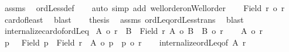 \begin{isabellebody}
\ assms\ \isamarkupfalse%
\ ordLess{\isacharunderscore}{\kern0pt}def\isanewline
\ \ \isamarkupfalse%
\ {\isacharparenleft}{\kern0pt}auto\ simp\ add{\isacharcolon}{\kern0pt}\ well{\isacharunderscore}{\kern0pt}order{\isacharunderscore}{\kern0pt}on{\isacharunderscore}{\kern0pt}Well{\isacharunderscore}{\kern0pt}order{\isacharparenright}{\kern0pt}\isanewline
\ \ \isamarkupfalse%
\ {\isachardoublequoteopen}{\isacharbar}{\kern0pt}Field\ r{\isacharbar}{\kern0pt}\ {\isasymle}o\ r{\isachardoublequoteclose}\ \isamarkupfalse%
\ card{\isacharunderscore}{\kern0pt}of{\isacharunderscore}{\kern0pt}least\ \isamarkupfalse%
\ blast\isanewline
\ \ \isamarkupfalse%
\ {\isacharquery}{\kern0pt}thesis\ \isamarkupfalse%
\ assms\ ordLeq{\isacharunderscore}{\kern0pt}ordLess{\isacharunderscore}{\kern0pt}trans\ \isamarkupfalse%
\ blast\isanewline
{}\isamarkupfalse%
%
\endisatagproof
{\isafoldproof}%
%
\isadelimproof
\isanewline
%
\endisadelimproof
\isanewline
{}\isamarkupfalse%
\ internalize{\isacharunderscore}{\kern0pt}card{\isacharunderscore}{\kern0pt}of{\isacharunderscore}{\kern0pt}ordLeq{\isacharcolon}{\kern0pt}\isanewline
{\isachardoublequoteopen}{\isacharparenleft}{\kern0pt}\ {\isacharbar}{\kern0pt}A{\isacharbar}{\kern0pt}\ {\isasymle}o\ r{\isacharparenright}{\kern0pt}\ {\isacharequal}{\kern0pt}\ {\isacharparenleft}{\kern0pt}{\isasymexists}B\ {\isasymle}\ Field\ r{\isachardot}{\kern0pt}\ {\isacharbar}{\kern0pt}A{\isacharbar}{\kern0pt}\ {\isacharequal}{\kern0pt}o\ {\isacharbar}{\kern0pt}B{\isacharbar}{\kern0pt}\ {\isasymand}\ {\isacharbar}{\kern0pt}B{\isacharbar}{\kern0pt}\ {\isasymle}o\ r{\isacharparenright}{\kern0pt}{\isachardoublequoteclose}\isanewline
%
\isadelimproof
%
\endisadelimproof
%
\isatagproof
{}\isamarkupfalse%
\isanewline
\ \ \isamarkupfalse%
\ {\isachardoublequoteopen}{\isacharbar}{\kern0pt}A{\isacharbar}{\kern0pt}\ {\isasymle}o\ r{\isachardoublequoteclose}\isanewline
\ \ \isamarkupfalse%
\ \isamarkupfalse%
\ p\ \ {}{\isacharcolon}{\kern0pt}\ {\isachardoublequoteopen}Field\ p\ {\isasymle}\ Field\ r\ {\isasymand}\ {\isacharbar}{\kern0pt}A{\isacharbar}{\kern0pt}\ {\isacharequal}{\kern0pt}o\ p\ {\isasymand}\ p\ {\isasymle}o\ r{\isachardoublequoteclose}\isanewline
\ \ \isamarkupfalse%
\ internalize{\isacharunderscore}{\kern0pt}ordLeq{\isacharbrackleft}{\kern0pt}of\ {\isachardoublequoteopen}{\isacharbar}{\kern0pt}A{\isacharbar}{\kern0pt}{\isachardoublequoteclose}\ r{\isacharbrackright}{\kern0pt}\ \isamarkupfalse%

\end{isabellebody}
